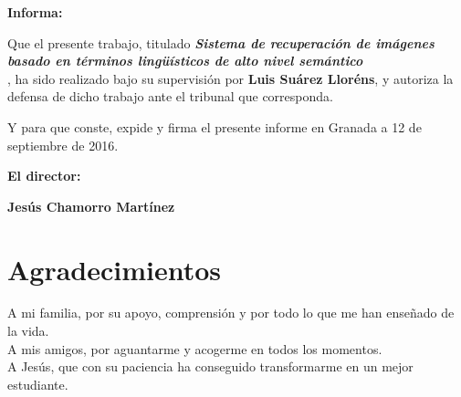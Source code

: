 \vspace{0.5cm}

\textbf{Informa:}

\vspace{0.5cm}

Que el presente trabajo, titulado \textit{\textbf{Sistema de recuperación de imágenes basado en
términos lingüísticos de alto nivel semántico
\\}},
ha sido realizado bajo su supervisión por \textbf{Luis Suárez Lloréns}, y autoriza la defensa de dicho trabajo ante el tribunal
que corresponda.

\vspace{0.5cm}

Y para que conste, expide y firma el presente informe en Granada a 12 de septiembre de 2016.

\vspace{1cm}

\textbf{El director:}

\vspace{5cm}

\noindent \textbf{Jesús Chamorro Martínez}

\chapter*{Agradecimientos}
\thispagestyle{empty}

       \vspace{1cm}


A mi familia, por su apoyo, comprensión y por todo lo que me han enseñado de la vida. \\

A mis amigos, por aguantarme y acogerme en todos los momentos.\\

A Jesús, que con su paciencia ha conseguido transformarme en un mejor estudiante.

